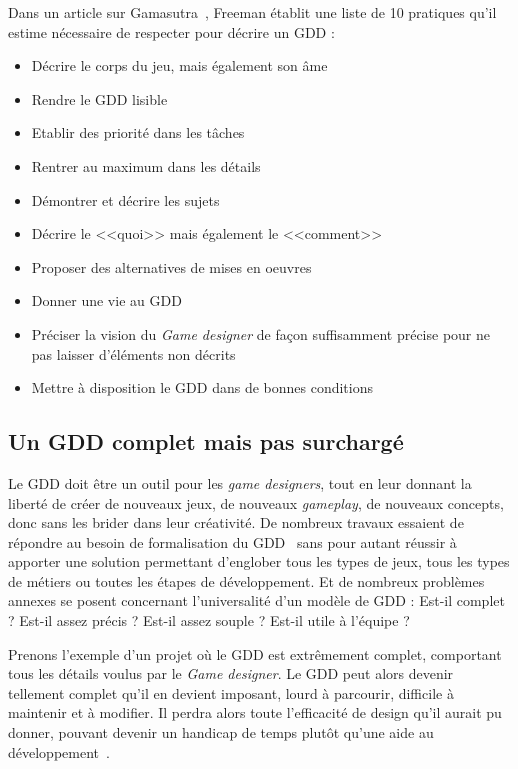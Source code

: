 Dans un article sur Gamasutra~\cite{gama_greateGDD}, Freeman établit une liste de 10 pratiques qu'il estime nécessaire de respecter pour d\'ecrire un GDD :
\begin{itemize}
    \item Décrire le corps du jeu, mais également son âme
    \item Rendre le GDD lisible
    \item Etablir des priorité dans les tâches
    \item Rentrer au maximum dans les détails
    \item Démontrer et décrire les sujets
    \item Décrire le <<quoi>> mais également le <<comment>>
    \item Proposer des alternatives de mises en oeuvres 
    \item Donner une vie au GDD
    \item Pr\'eciser la vision du \emph{Game designer} de fa\c{c}on suffisamment précise pour ne pas laisser d'éléments non décrits
    \item Mettre à disposition le GDD dans de bonnes conditions
\end{itemize}

\subsection{Un GDD complet mais pas surchargé}


Le GDD doit \^etre un outil pour les \emph{game designers}, tout en leur donnant la liberté de créer de nouveaux jeux, de nouveaux \emph{gameplay}, de nouveaux concepts, donc sans les brider dans leur cr\'eativit\'e.
De nombreux travaux essaient de répondre au besoin de formalisation du GDD~\cite{GDD_software,multiview,GDD_GDProject,gama_greateGDD} sans pour autant réussir à apporter une solution permettant d'englober tous les types de jeux, tous les types de métiers ou toutes les étapes de développement.
Et de nombreux problèmes annexes se posent concernant l'universalité d'un modèle de GDD : Est-il complet ? Est-il assez précis ? Est-il assez souple ? Est-il utile à l'équipe ? 

Prenons l'exemple d'un projet où le GDD est extrêmement complet, comportant tous les détails voulus par le \emph{Game designer}.
Le GDD peut alors devenir tellement complet qu'il en devient imposant, lourd à parcourir, difficile à maintenir et à modifier.
Il perdra alors toute l'efficacité de design qu'il aurait pu donner, pouvant devenir un handicap de temps plutôt qu'une aide au développement~\cite{onepage_librande}.

